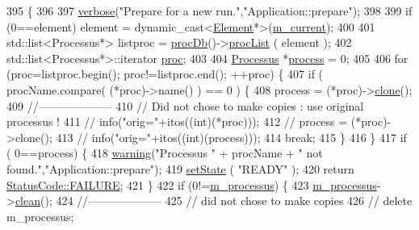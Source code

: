 \begin{DoxyCode}
395                                                \{
396 
397   \hyperlink{classObject_a83d2db2df682907ea1115ad721c1c4a1}{verbose}(\textcolor{stringliteral}{"Prepare for a new run."},\textcolor{stringliteral}{"Application::prepare"});
398 
399   \textcolor{keywordflow}{if} (0==element) element = \textcolor{keyword}{dynamic\_cast<}\hyperlink{classElement}{Element}*\textcolor{keyword}{>}(\hyperlink{classApplication_ab0fd877a3c66c41b22109863e1719ccd}{m\_current});
400 
401   std::list<Processus*> listproc = \hyperlink{classApplication_aa5c28af1a7e1c41dada2db2a4d03c57d}{procDb}()->\hyperlink{classProcDataBase_a8145de34e9857f3f6eebd2572740f198}{procList} ( element );
402   std::list<Processus*>::iterator \hyperlink{namespaceproc}{proc};
403 
404   \hyperlink{classProcessus}{Processus} *\hyperlink{namespaceshell_ae1ffb966b730c62592e1093acd8d9e29}{process} = 0;
405 
406   \textcolor{keywordflow}{for} (proc=listproc.begin(); proc!=listproc.end(); ++proc) \{
407     \textcolor{keywordflow}{if} ( procName.compare( (*proc)->name() ) == 0 ) \{
408       process = (*proc)->\hyperlink{classProcessus_aca8856f6d6d7b7e1fe941f298dcbb502}{clone}();
409       \textcolor{comment}{//--------------------}
410       \textcolor{comment}{// Did not chose to make copies : use original processus !}
411       \textcolor{comment}{//      info("orig="+itos((int)(*proc)));}
412       \textcolor{comment}{//      process = (*proc)->clone();}
413       \textcolor{comment}{//      info("orig="+itos((int)(process)));}
414       \textcolor{keywordflow}{break};
415     \}
416   \}
417   \textcolor{keywordflow}{if} ( 0==process) \{
418     \hyperlink{classObject_a65cd4fda577711660821fd2cd5a3b4c9}{warning}(\textcolor{stringliteral}{"Processus "} + procName + \textcolor{stringliteral}{" not found."},\textcolor{stringliteral}{"Application::prepare"});
419     \hyperlink{classApplication_a4a86c9bbf7851753c7b2bc03211092fb}{setState} ( \textcolor{stringliteral}{"READY"} );
420     \textcolor{keywordflow}{return} \hyperlink{classStatusCode_a6f565cbeadc76d14c72f047e5e85eb4ba3da73d4c469762eb9d3c960368252b26}{StatusCode::FAILURE};
421   \}
422   \textcolor{keywordflow}{if} (0!=\hyperlink{classApplication_ab5eb4b3d3bef5ab9fce9c69401ce5786}{m\_processus}) \{
423     \hyperlink{classApplication_ab5eb4b3d3bef5ab9fce9c69401ce5786}{m\_processus}->\hyperlink{classProcessus_aaeb17673b98d2b39f3aa780e335e0968}{clean}();
424     \textcolor{comment}{//--------------------}
425     \textcolor{comment}{// did not chose to make copies}
426     \textcolor{comment}{//    delete m\_processus;}

\end{DoxyCode}
